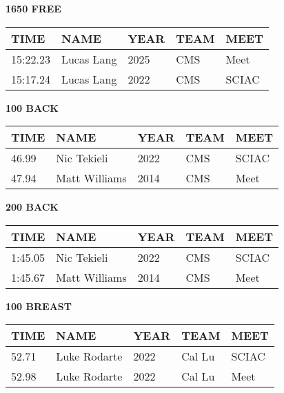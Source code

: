 \vspace{0.4cm}

\begin{minipage}[t]{0.48\textwidth}
\centering
\textbf{1650 FREE}\\[0.05cm]
\begin{tabular}{@{}p{1.8cm}p{2.8cm}p{1.2cm}p{1.4cm}p{1.4cm}@{}}
\hline
\textbf{TIME} & \textbf{NAME} & \textbf{YEAR} & \textbf{TEAM} & \textbf{MEET} \\
\hline
15:22.23 & Lucas Lang & 2025 & CMS & Meet \\
15:17.24 & Lucas Lang & 2022 & CMS & SCIAC \\
\hline
\end{tabular}
\end{minipage}\hfill
\begin{minipage}[t]{0.48\textwidth}
\centering
\textbf{100 BACK}\\[0.05cm]
\begin{tabular}{@{}p{1.8cm}p{2.8cm}p{1.2cm}p{1.4cm}p{1.4cm}@{}}
\hline
\textbf{TIME} & \textbf{NAME} & \textbf{YEAR} & \textbf{TEAM} & \textbf{MEET} \\
\hline
46.99 & Nic Tekieli & 2022 & CMS & SCIAC \\
47.94 & Matt Williams & 2014 & CMS & Meet \\
\hline
\end{tabular}
\end{minipage}

\vspace{0.4cm}

\begin{minipage}[t]{0.48\textwidth}
\centering
\textbf{200 BACK}\\[0.05cm]
\begin{tabular}{@{}p{1.8cm}p{2.8cm}p{1.2cm}p{1.4cm}p{1.4cm}@{}}
\hline
\textbf{TIME} & \textbf{NAME} & \textbf{YEAR} & \textbf{TEAM} & \textbf{MEET} \\
\hline
1:45.05 & Nic Tekieli & 2022 & CMS & SCIAC \\
1:45.67 & Matt Williams & 2014 & CMS & Meet \\
\hline
\end{tabular}
\end{minipage}\hfill
\begin{minipage}[t]{0.48\textwidth}
\centering
\textbf{100 BREAST}\\[0.05cm]
\begin{tabular}{@{}p{1.8cm}p{2.8cm}p{1.2cm}p{1.4cm}p{1.4cm}@{}}
\hline
\textbf{TIME} & \textbf{NAME} & \textbf{YEAR} & \textbf{TEAM} & \textbf{MEET} \\
\hline
52.71 & Luke Rodarte & 2022 & Cal Lu & SCIAC \\
52.98 & Luke Rodarte & 2022 & Cal Lu & Meet \\
\hline
\end{tabular}
\end{minipage}

